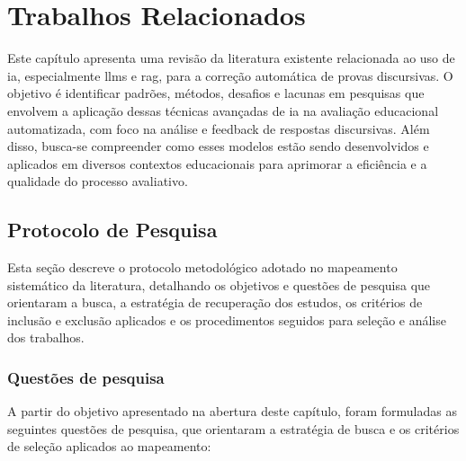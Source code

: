 \chapter{Trabalhos Relacionados}
\label{cap:trabalhos}

Este capítulo apresenta uma revisão da literatura existente relacionada ao uso de \gls{ia}, especialmente \gls{llm}s e \gls{rag}, para a correção automática de provas discursivas. O objetivo é identificar padrões, métodos, desafios e lacunas em pesquisas que envolvem a aplicação dessas técnicas avançadas de \gls{ia} na avaliação educacional automatizada, com foco na análise e feedback de respostas discursivas. Além disso, busca-se compreender como esses modelos estão sendo desenvolvidos e aplicados em diversos contextos educacionais para aprimorar a eficiência e a qualidade do processo avaliativo.

\section{Protocolo de Pesquisa}

Esta seção descreve o protocolo metodológico adotado no mapeamento sistemático da literatura, detalhando os objetivos e questões de pesquisa que orientaram a busca, a estratégia de recuperação dos estudos, os critérios de inclusão e exclusão aplicados e os procedimentos seguidos para seleção e análise dos trabalhos.

\subsection{Questões de pesquisa}
\label{subsec:questoes_pesquisa}

A partir do objetivo apresentado na abertura deste capítulo, foram formuladas as seguintes questões de pesquisa, que orientaram a estratégia de busca e os critérios de seleção aplicados ao mapeamento:

